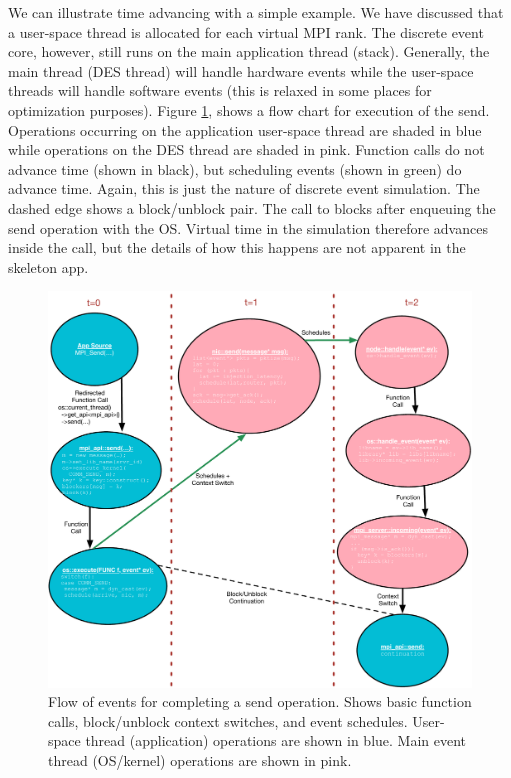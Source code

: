 We can illustrate time advancing with a simple  example.
We have discussed that a user-space thread is allocated for each virtual MPI rank.
The discrete event core, however, still runs on the main application thread (stack).
Generally, the main thread (DES thread) will handle hardware events while the user-space threads will handle software events (this is relaxed in some places for optimization purposes).
Figure \ref{fig:desThreadsMPISend}, shows a flow chart for execution of the send.
Operations occurring on the application user-space thread are shaded in blue while operations on the DES thread are shaded in pink.
Function calls do not advance time (shown in black), but scheduling events (shown in green) do advance time.
Again, this is just the nature of discrete event simulation.
The dashed edge shows a block/unblock pair.  
The call to  blocks after enqueuing the send operation with the OS.
Virtual time in the simulation therefore advances inside the  call,
but the details of how this happens are not apparent in the skeleton app.

\begin{figure}
\includegraphics[width=1.05\textwidth]{figures/DES}
\caption{Flow of events for completing a send operation.  Shows basic function calls, block/unblock context switches, and event schedules. User-space thread (application) operations are shown in blue. Main event thread (OS/kernel) operations are shown in pink.}
\label{fig:desThreadsMPISend}
\end{figure}

